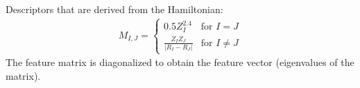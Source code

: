 Descriptors that are derived from the Hamiltonian:
\begin{align*}
M_{I,J} = 
\begin{cases}
0.5Z_{I}^{2.4}& \text{for } I = J \\
\frac{Z_{I}Z_{J}}{|R_I-R_J|}&  \text{for } I \neq J
\end{cases}
\end{align*}
The feature matrix is diagonalized to obtain the feature vector (eigenvalues of the matrix). 
